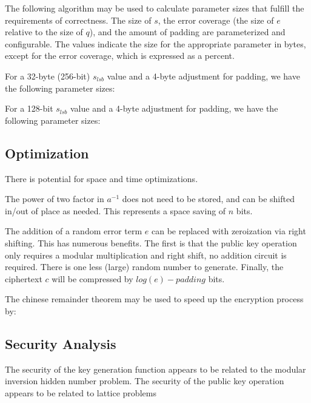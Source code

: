 \documentclass[preprint]{iacrtrans}
\begin{document}
The following algorithm may be used to calculate parameter sizes that fulfill the requirements of correctness. The size of $s$, the error coverage (the size of $e$ relative to the size of $q$), and the amount of padding are parameterized and configurable. The values indicate the size for the appropriate parameter in  bytes, except for the error coverage, which is expressed as a percent.


For a 32-byte (256-bit) $s_{lsb}$ value and a 4-byte adjustment for padding, we have the following parameter sizes:

For a 128-bit $s_{lsb}$ value and a 4-byte adjustment for padding, we have the following parameter sizes:


\subsection{Optimization}
There is potential for space and time optimizations.

The power of two factor in $a^{-1}$ does not need to be stored, and can be shifted in/out of place as needed. This represents a space saving of $n$ bits.

The addition of a random error term $e$ can be replaced with zeroization via right shifting. This has numerous benefits. The first is that the public key operation only requires a modular multiplication and right shift, no addition circuit is required. There is one less (large) random number to generate. Finally, the ciphertext $c$ will be compressed by $log(e) - padding$ bits.

The chinese remainder theorem may be used to speed up the encryption process by: 

\subsection{Security Analysis}
The security of the key generation function appears to be related to the modular inversion hidden number problem.
The security of the public key operation appears to be related to lattice problems
\todo{}
\end{document}
